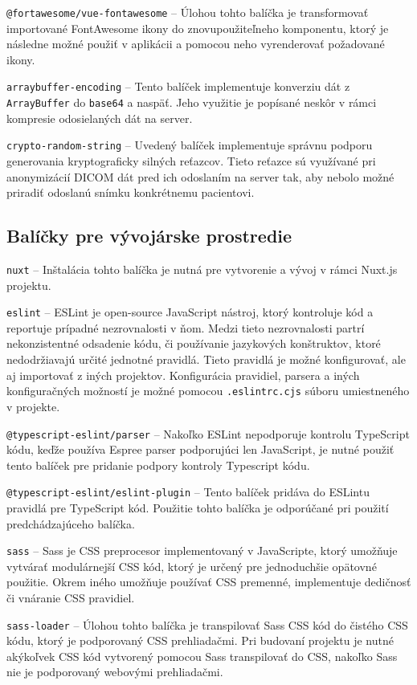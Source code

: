 \texttt{@fortawesome/vue-fontawesome} -- Úlohou tohto balíčka je transformovať importované FontAwesome ikony do znovupoužiteľneho komponentu, ktorý je následne možné použiť v aplikácii a pomocou neho vyrenderovať požadované ikony.

\texttt{arraybuffer-encoding} -- Tento balíček implementuje konverziu dát z \texttt{ArrayBuffer} do \texttt{base64} a naspäť. Jeho využitie je popísané neskôr v rámci kompresie odosielaných dát na server.

\texttt{crypto-random-string} -- Uvedený balíček implementuje správnu podporu generovania kryptograficky silných reťazcov. Tieto reťazce sú využívané pri anonymizácií DICOM dát pred ich odoslaním na server tak, aby nebolo možné priradiť odoslanú snímku konkrétnemu pacientovi.

\subsection {Balíčky pre vývojárske prostredie}
\texttt{nuxt} -- Inštalácia tohto balíčka je nutná pre vytvorenie a vývoj v rámci Nuxt.js projektu.

\texttt{eslint} -- ESLint je open-source JavaScript nástroj, ktorý kontroluje kód a reportuje prípadné nezrovnalosti v ňom. Medzi tieto nezrovnalosti partrí nekonzistentné odsadenie kódu, či používanie jazykových konštruktov, ktoré nedodržiavajú určité jednotné pravidlá. Tieto pravidlá je možné konfigurovať, ale aj importovať z iných projektov. Konfigurácia pravidiel, parsera a iných konfiguračných možností je možné pomocou \texttt{.eslintrc.cjs} súboru umiestneného v projekte.

\texttt{@typescript-eslint/parser} -- Nakoľko ESLint nepodporuje kontrolu TypeScript kódu, keďže používa Espree parser podporujúci len JavaScript, je nutné použiť tento balíček pre pridanie podpory kontroly Typescript kódu. 

\texttt{@typescript-eslint/eslint-plugin} -- Tento balíček pridáva do ESLintu pravidlá pre TypeScript kód. Použitie tohto balíčka je odporúčané pri použití predchádzajúceho balíčka.

\texttt{sass} -- Sass je CSS preprocesor implementovaný v JavaScripte, ktorý umožňuje vytvárať modulárnejší CSS kód, ktorý je určený pre jednoduchšie opätovné použitie. Okrem iného umožňuje používať CSS premenné, implementuje dedičnosť či vnáranie CSS pravidiel.

\texttt{sass-loader} -- Úlohou tohto balíčka je transpilovať Sass CSS kód do čistého CSS kódu, ktorý je podporovaný CSS prehliadačmi. Pri budovaní projektu je nutné akýkoľvek CSS kód vytvorený pomocou Sass transpilovať do CSS, nakoľko Sass nie je podporovaný webovými prehliadačmi.

